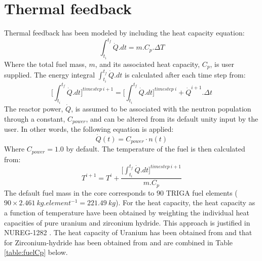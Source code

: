 \documentclass[11pt,letterpaper,titlepage]{article}
\begin{document}
\section{Thermal feedback}
Thermal feedback has been modeled by including the heat capacity equation:
\newline
$$
\int_{t_i}^{t_f} \dot{Q}.dt=m.C_p.\Delta T
$$
\newline
\noindent
Where the total fuel mass, $m$, and its associated heat capacity, $C_p$, is user supplied. The energy integral $\int_{t_i}^{t_f}\dot{Q}.dt$ is calculated after each time step from:
\newline
$$
\biggr[ \int_{t_i}^{t_f}\dot{Q}.dt   \biggr]^{timestep \ i+1}=\biggr[ \int_{t_i}^{t_f}\dot{Q}.dt   \biggr]^{timestep \ i} + \dot{Q}^{i+1}.\Delta t
$$
\newline
\noindent
The reactor power, $\dot{Q}$, is assumed to be associated with the neutron population through a constant, $C_{power}$, and can be altered from its default unity input by the user. In other words, the following equation is applied:
\newline
$$
\dot{Q}(t)=C_{power}\cdot n(t)
$$
\newline
\noindent
Where $C_{power}=1.0$ by default. The temperature of the fuel is then calculated from:
\newline
$$
T^{i+1}=T^i+\frac{\biggr[ \int_{t_i}^{t_f}\dot{Q}.dt   \biggr]^{timestep \ i+1}}{m.C_p}
$$
\newline
\newline
The default fuel mass in the core corresponds to $90$ TRIGA fuel elements ($90\times 2.461 \ kg.element^{-1}=221.49 \ kg$). For the heat capacity, the heat capacity as a function of temperature have been obtained by weighting the individual heat capacities of pure uranium and zirconium hydride. This approach is justified in NUREG-1282 \cite{NUREG1282}. The heat capacity of Uranium has been obtained from \cite{CpUranium} and that for Zirconium-hydride has been obtained from \cite{CpZircHydride} and are combined in Table \ref{table:fuelCp} below.
\end{document}
